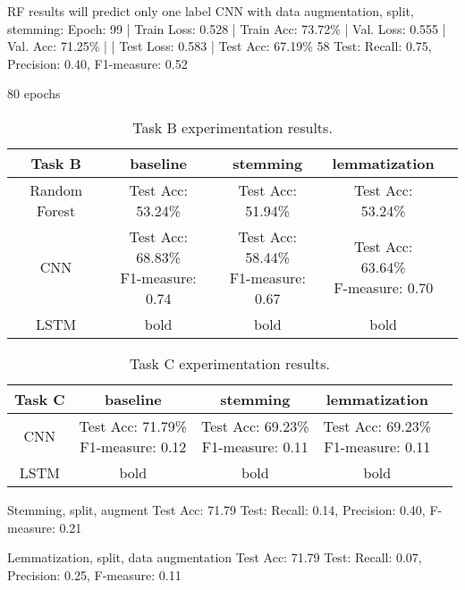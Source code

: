 \documentclass[11pt,a4paper]{article}
\begin{document}
RF results will predict only one label
CNN with data augmentation, split, stemming:
 Epoch: 99 | Train Loss: 0.528 | Train Acc: 73.72\% | Val. Loss: 0.555 | Val. Acc: 71.25\% |
| Test Loss: 0.583 | Test Acc: 67.19\%
58
Test: Recall: 0.75, Precision: 0.40, F1-measure: 0.52

80 epochs

\begin{table*}[t]
\begin{center}
\begin{tabular}{|c|cccc|}
\hline \bf Task B & \bf baseline & \bf stemming & \bf lemmatization & \\ \hline
Random Forest & Test Acc: 53.24\% & Test Acc: 51.94\% & Test Acc: 53.24\% & \\ \hline
CNN & \shortstack{Test Acc: 68.83\% \\ F1-measure: 0.74}  & \shortstack{Test Acc: 58.44\% \\ F1-measure: 0.67} & \shortstack{Test Acc: 63.64\% \\ F-measure: 0.70} & \\ \hline
LSTM & bold & bold & bold & \\
\hline
\end{tabular}
\end{center}
\caption{\label{font-table} Task B experimentation results.}
\end{table*}

\begin{table*}[t]
\begin{center}
\begin{tabular}{|c|cccc|}
\hline \bf Task C & \bf baseline & \bf stemming & \bf lemmatization & \\ \hline
CNN & \shortstack{Test Acc: 71.79\% \\ F1-measure: 0.12}  & \shortstack{Test Acc: 69.23\% \\ F1-measure: 0.11} & \shortstack{Test Acc: 69.23\% \\ F1-measure: 0.11} & \\ \hline
LSTM & bold & bold & bold & \\
\hline
\end{tabular}
\end{center}
\caption{\label{font-table} Task C experimentation results. }
\end{table*}

Stemming, split, augment
Test Acc: 71.79%
Test: Recall: 0.14, Precision: 0.40, F-measure: 0.21

Lemmatization, split, data augmentation
Test Acc: 71.79%
Test: Recall: 0.07, Precision: 0.25, F-measure: 0.11
\end{document}
